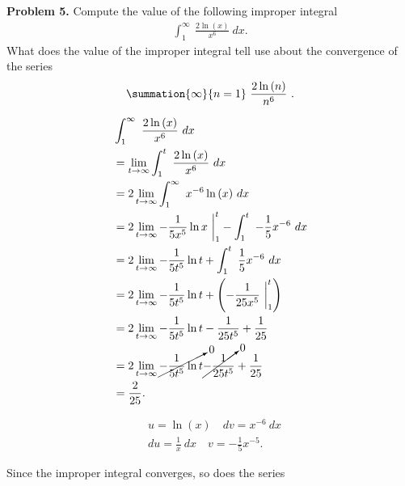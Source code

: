 \documentclass{report}
\begin{document}
   \pagebreak \bigbreak \noindent 
   \begin{mdframed}
       \textbf{Problem 5.} Compute the value of the following improper integral
       \begin{align*}
          \int_{1}^{\infty}\ \frac{2\ln{(x)}}{x^{6}}\ dx 
       .\end{align*}
       What does the value of the improper integral tell use about the convergence of the series
       \begin{align*}
           \summation{\infty}{n=1}\ \frac{2\ln{(n)}}{n^{6}}\ 
       .\end{align*}
   \end{mdframed}
   \bigbreak \noindent 
   \begin{minipage}[t]{0.5\textwidth}
   \begin{align*}
       &\int_{1}^{\infty}\ \frac{2\ln{(x)}}{x^{6}}\ dx \\
       &=\lim\limits_{t \to \infty}{\int_{1}^{t}\ \frac{2\ln{(x)}}{x^{6}}\ dx} \\
      &=2\lim\limits_{t \to \infty}{\int_{1}^{\infty}\ x^{-6}\ln{(x)}\ dx} \\
      &=2\lim\limits_{t \to \infty}{-\frac{1}{5x^{5}}\ln{x}}\ \bigg|_1^{t} - \int_{1}^{t}\ -\frac{1}{5}x^{-6}\ dx \\
      &=2\lim\limits_{t \to \infty}{-\frac{1}{5t^{5}}\ln{t}} + \int_{1}^{t}\ \frac{1}{5}x^{-6}\ dx \\
      &=2\lim\limits_{t \to \infty}{-\frac{1}{5t^{5}}\ln{t}} + \left(-\frac{1}{25x^{5}}\ \bigg|_1^{t}\right)\\
        &=2\lim\limits_{t \to \infty}{-\frac{1}{5t^{5}}\ln{t}} -\frac{1}{25t^{5}} + \frac{1}{25}\\
        &=2\lim\limits_{t \to \infty}{\cancelto{0}{-\frac{1}{5t^{5}}\ln{t}}} \cancelto{0}{-\frac{1}{25t^{5}}} + \frac{1}{25}\\
        &=\frac{2}{25}
   .\end{align*}
   \end{minipage}
   \begin{minipage}[t]{0.42\textwidth}
       \begin{align*}
           &u = \ln{(x)} \quad dv = x^{-6}\ dx \\
           &du = \frac{1}{x}\ dx \quad v = -\frac{1}{5}x^{-5}
       .\end{align*}
   \end{minipage}
   \bigbreak \noindent 
   Since the improper integral converges, so does the series
\end{document}
